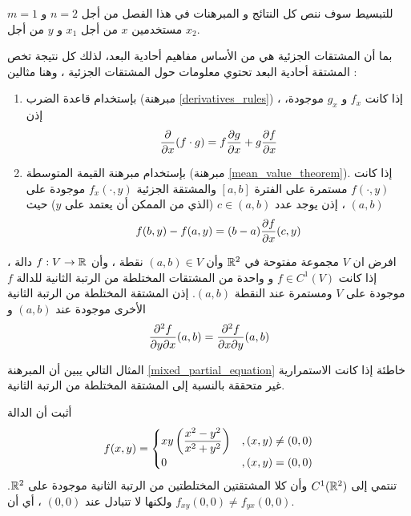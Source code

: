 \begin{note}
    للتبسيط سوف ننص كل النتائج و المبرهنات في هذا الفصل من أجل $n=2$ و $m=1$ مستخدمين $x$ من أجل $x_1$ و $y$ من أجل $x_2$.
\end{note}

\begin{note}
    بما أن المشتقات الجزئية هي من الأساس مفاهيم أحادية البعد، لذلك كل نتيجة تخص المشتقة أحادية البعد تحتوي معلومات حول المشتقات الجزئية ، وهنا مثالين :
    \begin{enumerate}
    \item بإستخدام قاعدة الضرب (مبرهنة \ref{derivatives_rules}) ، إذا كانت $f_x$ و $g_x$ موجودة، إذن
    \[
    \dfrac{\partial}{\partial x}(f\cdot g)=f\dfrac{\partial g}{\partial x}+g\dfrac{\partial f}{\partial x}
    \]

    \item بإستخدام مبرهنة القيمة المتوسطة (مبرهنة \ref{mean_value_theorem}). إذا كانت $f(\cdot,y)$ مستمرة على الفترة $[a,b]$ والمشتقة الجزئية $f_x(\cdot,y)$ موجودة على $(a,b)$ ، إذن يوجد عدد $c\in(a,b)$ (الذي من الممكن أن يعتمد على $y$) حيث
\[
f(b,y)-f(a,y)=(b-a)\dfrac{\partial f}{\partial x}(c,y)
\]
    \end{enumerate}
\end{note}

\begin{theorem}
\label{mixed_partial_equation}
    افرض ان $V$ مجموعة مفتوحة في $\mathbb{R}^2$ وأن $(a,b)\in V$ نقطة ، وأن $f:V\to\mathbb{R}$ دالة ، إذا كانت $f\in C^1(V)$ و واحدة من المشتقات المختلطة من الرتبة الثانية للدالة $f$ موجودة على $V$ ومستمرة عند النقطة $(a,b)$. إذن المشتقة المختلطة من الرتبة الثانية الأخرى موجودة عند $(a,b)$ و
\[
\dfrac{\partial^2f}{\partial y\partial x}(a,b)=\dfrac{\partial^2f}{\partial x\partial y}(a,b)
\]
\end{theorem}

المثال التالي يبين أن المبرهنة \ref{mixed_partial_equation} خاطئة إذا كانت الاستمرارية غير متحققة بالنسبة إلى المشتقة المختلطة من الرتبة الثانية.

\begin{example}
    أثبت أن الدالة
\[
f(x,y)=\begin{cases}
    xy\left(\dfrac{x^2-y^2}{x^2+y^2}\right)&, (x,y)\neq(0,0)\\
    0&, (x,y)=(0,0)
\end{cases}
\]
تنتمي إلى $C^1(\mathbb{R}^2)$ وأن كلا المشتقتين المختلطتين من الرتبة الثانية موجودة على $\mathbb{R}^2$. ولكنها لا تتبادل عند $(0,0)$ ، أي أن $f_{xy}(0,0)\neq f_{yx}(0,0)$.
\end{example}

